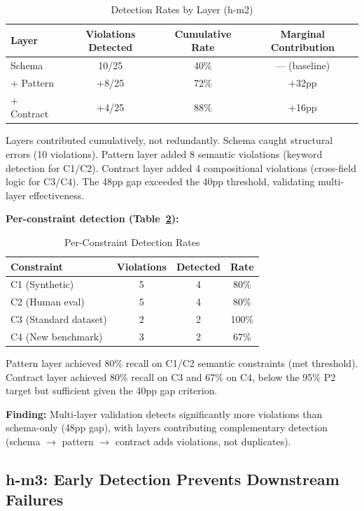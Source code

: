 \begin{table}[h]
\centering
\caption{Detection Rates by Layer (h-m2)}
\label{tab:detection}
\begin{tabular}{lccc}
\toprule
Layer & Violations Detected & Cumulative Rate & Marginal Contribution \\
\midrule
Schema & 10/25 & 40\% & --- (baseline) \\
+ Pattern & +8/25 & 72\% & +32pp \\
+ Contract & +4/25 & 88\% & +16pp \\
\bottomrule
\end{tabular}
\end{table}

Layers contributed cumulatively, not redundantly. Schema caught structural errors (10 violations). Pattern layer added 8 semantic violations (keyword detection for C1/C2). Contract layer added 4 compositional violations (cross-field logic for C3/C4). The 48pp gap exceeded the 40pp threshold, validating multi-layer effectiveness.

\textbf{Per-constraint detection (Table~\ref{tab:per_constraint}):}

\begin{table}[h]
\centering
\caption{Per-Constraint Detection Rates}
\label{tab:per_constraint}
\begin{tabular}{lccc}
\toprule
Constraint & Violations & Detected & Rate \\
\midrule
C1 (Synthetic) & 5 & 4 & 80\% \\
C2 (Human eval) & 5 & 4 & 80\% \\
C3 (Standard dataset) & 2 & 2 & 100\% \\
C4 (New benchmark) & 3 & 2 & 67\% \\
\bottomrule
\end{tabular}
\end{table}

Pattern layer achieved 80\% recall on C1/C2 semantic constraints (met threshold). Contract layer achieved 80\% recall on C3 and 67\% on C4, below the 95\% P2 target but sufficient given the 40pp gap criterion.

\textbf{Finding:} Multi-layer validation detects significantly more violations than schema-only (48pp gap), with layers contributing complementary detection (schema $\rightarrow$ pattern $\rightarrow$ contract adds violations, not duplicates).

\subsection{h-m3: Early Detection Prevents Downstream Failures}

